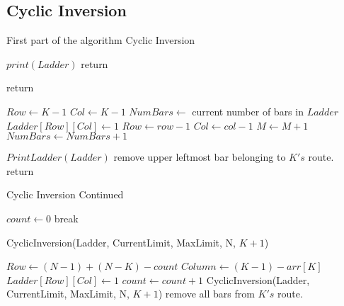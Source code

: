 \subsection{Cyclic Inversion}
\begin{algorithm}
  \caption{First part of the algorithm Cyclic Inversion}
  \begin{algorithmic}[1]


      
        \State $print(Ladder)$
        \State return
      \EndIf

        \State return
      \EndIf


      \State $Row \gets K-1$
      \State $Col \gets K-1$
      \State $NumBars \gets$ current number of bars in $Ladder$
        \State $Ladder[Row][Col] \gets 1$
        \State $Row \gets row-1$
        \State $Col \gets col-1$
        \State $M \gets M+1$
        \State $NumBars \gets NumBars+1$
      \EndWhile

        \State $PrintLadder(Ladder)$
      \EndIf
      \State remove upper leftmost bar belonging to $K's$ route.
      \State return


  \end{algorithmic}
\end{algorithm}

\begin{algorithm}
  \caption{Cyclic Inversion Continued}
    \begin{algorithmic}[1]

    \Else 
      \State $count \gets 0$
            \State break
        \EndIf

          \State CyclicInversion(Ladder, CurrentLimit, MaxLimit, N, $K+1$)
      
       
        
        \Else
          \State $Row \gets (N-1) + (N-K) - count$
          \State $Column \gets (K-1)-arr[K]$
          \State $Ladder[Row][Col] \gets 1$
          \State $count \gets count + 1$
          \State CyclicInversion(Ladder, CurrentLimit, MaxLimit, N, $K+1$)
        \EndIf
      \EndFor
      \State remove all bars from $K's$ route.

    \EndIf
    \EndFunction
  \end{algorithmic}
\end{algorithm}


